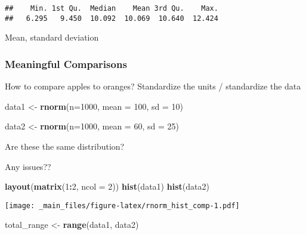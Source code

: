 \documentclass[
]{book}
\newenvironment{Shaded}{\begin{snugshade}}{\end{snugshade}}
\newcommand{\DataTypeTok}[1]{\textcolor[rgb]{0.13,0.29,0.53}{#1}}
\newcommand{\DecValTok}[1]{\textcolor[rgb]{0.00,0.00,0.81}{#1}}
\newcommand{\KeywordTok}[1]{\textcolor[rgb]{0.13,0.29,0.53}{\textbf{#1}}}
\newcommand{\NormalTok}[1]{#1}
\newcommand{\OperatorTok}[1]{\textcolor[rgb]{0.81,0.36,0.00}{\textbf{#1}}}
\newcommand{\StringTok}[1]{\textcolor[rgb]{0.31,0.60,0.02}{#1}}
\begin{document}
\begin{verbatim}
##    Min. 1st Qu.  Median    Mean 3rd Qu.    Max. 
##   6.295   9.450  10.092  10.069  10.640  12.424
\end{verbatim}

Mean, standard deviation

\hypertarget{meaningful-comparisons}{%
\subsubsection{Meaningful Comparisons}\label{meaningful-comparisons}}

How to compare apples to oranges? Standardize the units / standardize the data

\begin{Shaded}
\begin{Highlighting}[]
\NormalTok{data1 <-}\StringTok{ }\KeywordTok{rnorm}\NormalTok{(}\DataTypeTok{n=}\DecValTok{1000}\NormalTok{, }
              \DataTypeTok{mean =} \DecValTok{100}\NormalTok{,}
              \DataTypeTok{sd =} \DecValTok{10}\NormalTok{)}

\NormalTok{data2 <-}\StringTok{ }\KeywordTok{rnorm}\NormalTok{(}\DataTypeTok{n=}\DecValTok{1000}\NormalTok{,}
               \DataTypeTok{mean =} \DecValTok{60}\NormalTok{, }
               \DataTypeTok{sd =} \DecValTok{25}\NormalTok{)}
\end{Highlighting}
\end{Shaded}

Are these the same distribution?

Any issues??

\begin{Shaded}
\begin{Highlighting}[]
\KeywordTok{layout}\NormalTok{(}\KeywordTok{matrix}\NormalTok{(}\DecValTok{1}\OperatorTok{:}\DecValTok{2}\NormalTok{, }\DataTypeTok{ncol =} \DecValTok{2}\NormalTok{))}
\KeywordTok{hist}\NormalTok{(data1)}
\KeywordTok{hist}\NormalTok{(data2)}
\end{Highlighting}
\end{Shaded}

\texttt{[image: \_main\_files/figure-latex/rnorm\_hist\_comp-1.pdf]}

\begin{Shaded}
\begin{Highlighting}[]
\NormalTok{total_range <-}\StringTok{ }\KeywordTok{range}\NormalTok{(data1, data2)}
\end{Highlighting}
\end{Shaded}
\end{document}
